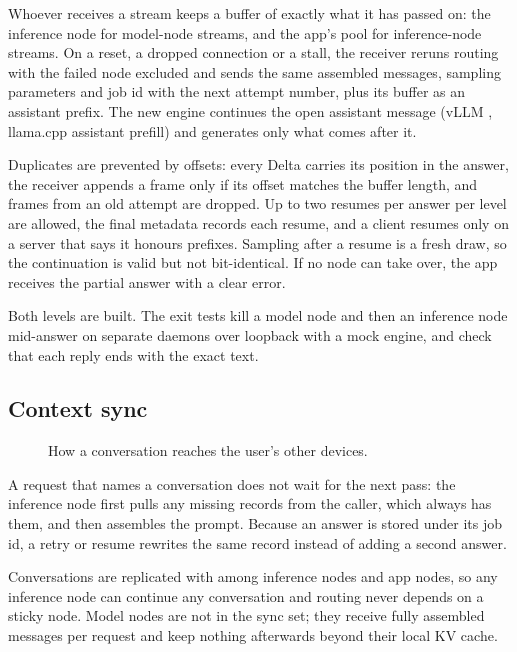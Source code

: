 Whoever receives a stream keeps a buffer of exactly what it has passed on: the inference node for
model-node streams, and the app's  pool for inference-node streams. On a
reset, a dropped connection or a stall, the receiver reruns routing with the failed node
excluded and sends the same assembled messages, sampling parameters and job id with the next
attempt number, plus its buffer as an assistant prefix. The new engine continues the open
assistant message (vLLM , llama.cpp assistant prefill) and generates
only what comes after it.

Duplicates are prevented by offsets: every Delta carries its position in the answer, the receiver
appends a frame only if its offset matches the buffer length, and frames from an old attempt are
dropped. Up to two resumes per answer per level are allowed, the final metadata records each
resume, and a client resumes only on a server that says it honours prefixes. Sampling after a
resume is a fresh draw, so the continuation is valid but not bit-identical. If no node can take
over, the app receives the partial answer with a clear error.

Both levels are built. The exit tests kill a model node and then an
inference node mid-answer on separate daemons over loopback with a mock engine, and check that
each reply ends with the exact text.

\subsection{Context sync}\label{sec:context}

\begin{figure}[htbp]
\centering
{}
\caption{How a conversation reaches the user's other devices.}
\end{figure}

A request that names a conversation does not wait for the next pass: the inference node first
pulls any missing records from the caller, which always has them, and then assembles the prompt.
Because an answer is stored under its job id, a retry or resume rewrites the same record instead
of adding a second answer.

Conversations are replicated with  among inference nodes and app nodes, so any
inference node can continue any conversation and routing never depends on a sticky node. Model
nodes are not in the sync set; they receive fully assembled messages per request and keep nothing
afterwards beyond their local KV cache.

